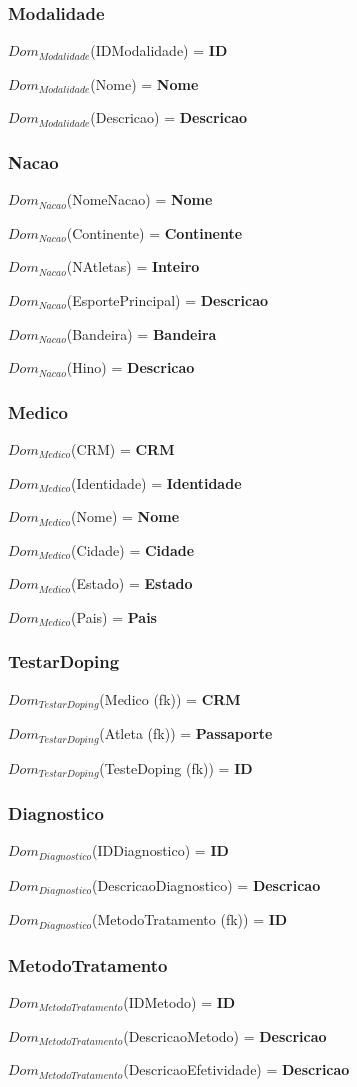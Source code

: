 \documentclass[12pt,a4paper]{article}
\newcommand{\createdomain}[3]{
    $Dom_{#1}$(#2) = {\bf #3}

}
\begin{document}
    \subsubsection{Modalidade}
        \createdomain{Modalidade}{IDModalidade}{\bf ID}
        \createdomain{Modalidade}{Nome}{\bf Nome}
        \createdomain{Modalidade}{Descricao}{\bf Descricao}

    \subsubsection{Nacao}
        \createdomain{Nacao}{NomeNacao}{\bf Nome}
        \createdomain{Nacao}{Continente}{\bf Continente}
        \createdomain{Nacao}{NAtletas}{\bf Inteiro}
        \createdomain{Nacao}{EsportePrincipal}{\bf Descricao}
        \createdomain{Nacao}{Bandeira}{\bf Bandeira}
        \createdomain{Nacao}{Hino}{\bf Descricao}

    \subsubsection{Medico}
        \createdomain{Medico}{CRM}{\bf CRM}
        \createdomain{Medico}{Identidade}{\bf Identidade}
        \createdomain{Medico}{Nome}{\bf Nome}
        \createdomain{Medico}{Cidade}{\bf Cidade}
        \createdomain{Medico}{Estado}{\bf Estado}
        \createdomain{Medico}{Pais}{\bf Pais}

    \subsubsection{TestarDoping}
        \createdomain{TestarDoping}{Medico (fk)}{\bf CRM}
        \createdomain{TestarDoping}{Atleta (fk)}{\bf Passaporte}
        \createdomain{TestarDoping}{TesteDoping (fk)}{\bf ID}

    \subsubsection{Diagnostico}
        \createdomain{Diagnostico}{IDDiagnostico}{\bf ID}
        \createdomain{Diagnostico}{DescricaoDiagnostico}{\bf Descricao}
        \createdomain{Diagnostico}{MetodoTratamento (fk)}{\bf ID}

    \subsubsection{MetodoTratamento}
        \createdomain{MetodoTratamento}{IDMetodo}{\bf ID}
        \createdomain{MetodoTratamento}{DescricaoMetodo}{\bf Descricao}
        \createdomain{MetodoTratamento}{DescricaoEfetividade}{\bf Descricao}
\end{document}

